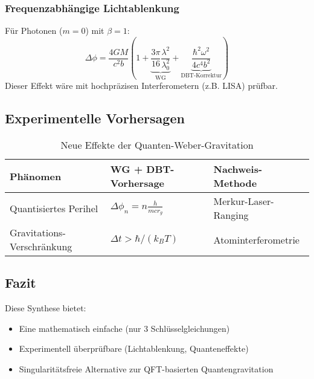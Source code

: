 \subsubsection{Frequenzabhängige Lichtablenkung}
Für Photonen ($m=0$) mit $\beta=1$:
\begin{equation}
    \Delta\phi = \frac{4GM}{c^2b}\left(1 + \underbrace{\frac{3\pi}{16}\frac{\lambda^2}{\lambda_0^2}}_{\text{WG}} + \underbrace{\frac{\hbar^2\omega^2}{4c^4b^2}}_{\text{DBT-Korrektur}}\right)
\end{equation}
Dieser Effekt wäre mit hochpräzisen Interferometern (z.B. LISA) prüfbar.

\subsection{Experimentelle Vorhersagen}
\begin{table}[ht]
    \centering
    \begin{tabular}{lll}
        \toprule
        Phänomen & WG + DBT-Vorhersage & Nachweis-Methode \\
        \midrule
        Quantisiertes Perihel & $\Delta\phi_n = n\frac{h}{mcr_g}$ & Merkur-Laser-Ranging \\
        Gravitations-Verschränkung & $\Delta t > \hbar/(k_B T)$ & Atominterferometrie \\
        \bottomrule
    \end{tabular}
    \caption{Neue Effekte der Quanten-Weber-Gravitation}
\end{table}

\subsection{Fazit}
Diese Synthese bietet:
\begin{itemize}
    \item Eine mathematisch einfache (nur 3 Schlüsselgleichungen)
    \item Experimentell überprüfbare (Lichtablenkung, Quanteneffekte)
    \item Singularitätsfreie Alternative zur QFT-basierten Quantengravitation
\end{itemize}


